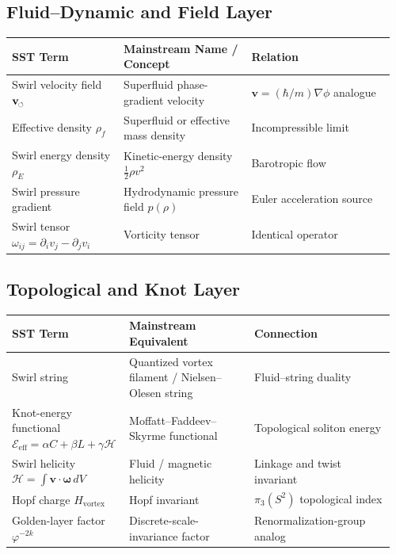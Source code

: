 \documentclass[11pt]{article}
\newcommand{\swirlarrow}{%
	\mathchoice{\mkern-2mu\scriptstyle\boldsymbol{\circlearrowleft}}%
	{\mkern-2mu\scriptstyle\boldsymbol{\circlearrowleft}}%
	{\mkern-2mu\scriptscriptstyle\boldsymbol{\circlearrowleft}}%
	{\mkern-2mu\scriptscriptstyle\boldsymbol{\circlearrowleft}}%
}
\newcommand{\vswirl}{\mathbf{v}_{\swirlarrow}}
\newcommand{\rhoF}{\rho_{\!f}}                           %
\newcommand{\rhoE}{\rho_{\!E}}                           %
\begin{document}
        \subsection*{Fluid–Dynamic and Field Layer}
            \begin{tabular}{p{0.28\linewidth} p{0.32\linewidth} p{0.36\linewidth}}
                \textbf{SST Term} & \textbf{Mainstream Name / Concept} & \textbf{Relation}\\
                \hline
                Swirl velocity field \(\vswirl\) & Superfluid phase-gradient velocity & \(\mathbf{v}=(\hbar/m)\nabla\phi\) analogue\\
                Effective density \(\rhoF\) & Superfluid or effective mass density & Incompressible limit\\
                Swirl energy density \(\rhoE\) & Kinetic-energy density \(\tfrac{1}{2}\rho v^2\) & Barotropic flow\\
                Swirl pressure gradient & Hydrodynamic pressure field \(p(\rho)\) & Euler acceleration source\\
                Swirl tensor \(\omega_{ij}=\partial_i v_j-\partial_j v_i\) & Vorticity tensor & Identical operator\\
            \end{tabular}

        \subsection*{Topological and Knot Layer}

            \begin{tabular}{p{0.28\linewidth} p{0.32\linewidth} p{0.36\linewidth}}
                \textbf{SST Term} & \textbf{Mainstream Equivalent} & \textbf{Connection}\\
                \hline
                Swirl string & Quantized vortex filament / Nielsen–Olesen string & Fluid–string duality\\
                Knot-energy functional \(\mathcal{E}_{\text{eff}}=\alpha C+\beta L+\gamma\mathcal{H}\) &
                Moffatt–Faddeev–Skyrme functional & Topological soliton energy\\
                Swirl helicity \(\mathcal{H}=\int\mathbf{v}\!\cdot\!\boldsymbol{\omega}\,dV\) &
                Fluid / magnetic helicity & Linkage and twist invariant \cite{Moffatt1969,Scheeler2014}\\
                Hopf charge \(H_{\text{vortex}}\) & Hopf invariant & \(\pi_3(S^2)\) topological index \cite{Faddeev1997}\\
                Golden-layer factor \(\varphi^{-2k}\) & Discrete-scale-invariance factor & Renormalization-group analog\\
            \end{tabular}
\end{document}

